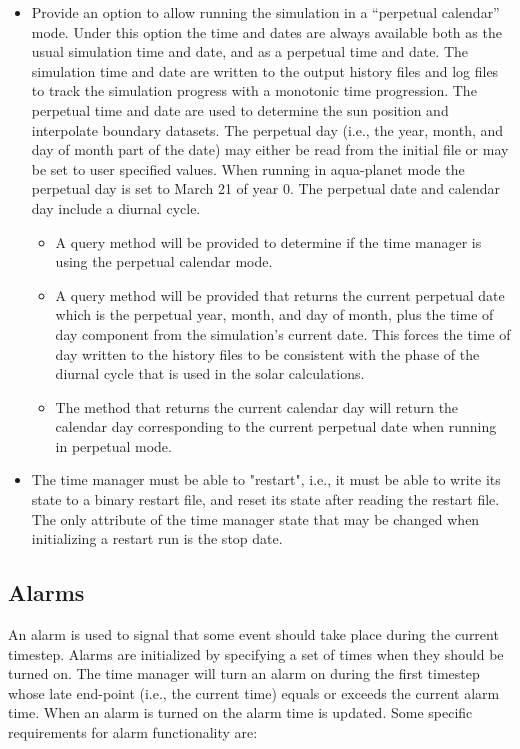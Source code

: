 \documentclass[12pt]{article}
\begin{document}
\begin{itemize}
\item
Provide an option to allow running the simulation in a ``perpetual
calendar'' mode.  Under this option the time and dates are always available
both as the usual simulation time and date, and as a perpetual time and
date.  The simulation time and date are written to the output history files
and log files to track the simulation progress with a monotonic time
progression.  The perpetual time and date are used to determine the sun
position and interpolate boundary datasets.  The perpetual day (i.e., the
year, month, and day of month part of the date) may either be read from the
initial file or may be set to user specified values.  When running in
aqua-planet mode the perpetual day is set to March 21 of year 0.  The
perpetual date and calendar day include a diurnal cycle.
\begin{itemize}
\item
A query method will be provided to determine if the time manager is using
the perpetual calendar mode.
\item
A query method will be provided that returns the current perpetual date
which is the perpetual year, month, and day of month, plus the time of day
component from the simulation's current date.  This forces the time of
day written to the history files to be consistent with the phase of the
diurnal cycle that is used in the solar calculations.
\item
The method that returns the current calendar day will return the calendar
day corresponding to the current perpetual date when running in perpetual
mode.
\end{itemize}

\item
The time manager must be able to "restart", i.e., it must be able to write
its state to a binary restart file, and reset its state after reading the
restart file.  The only attribute of the time manager state that may be
changed when initializing a restart run is the stop date.

\end{itemize}

\subsection{Alarms}

An alarm is used to signal that some event should take place during the
current timestep.  Alarms are initialized by specifying a set of times when
they should be turned on.  The time manager will turn an alarm on during
the first timestep whose late end-point (i.e., the current time) equals or
exceeds the current alarm time.  When an alarm is turned on the alarm time
is updated.  Some specific requirements for alarm functionality are:
\end{document}
